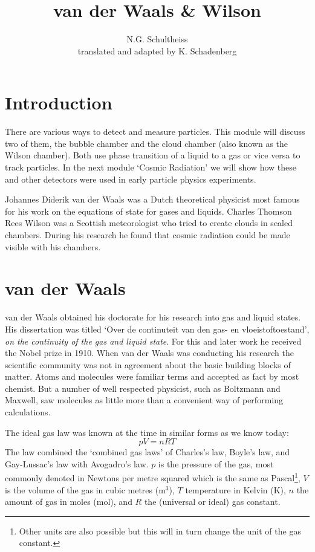 \documentclass[12pt,a4paper]{article}
\author{N.G. Schultheiss \\ translated and adapted by K. Schadenberg}
\date{}
\title{van der Waals \& Wilson}
\numberwithin{equation}{section}
\numberwithin{figure}{section}
\numberwithin{table}{section}
\begin{document}
\maketitle

\section{Introduction}
There are various ways to detect and measure particles. This module will discuss two of them, the bubble chamber and the cloud chamber (also known as the Wilson chamber). Both use phase transition of a liquid to a gas or vice versa to track particles. In the next module `Cosmic Radiation' we will show how these and other detectors were used in early particle physics experiments.

Johannes Diderik van der Waals was a Dutch theoretical physicist most famous for his work on the equations of state for gases and liquids. Charles Thomson Rees Wilson was a Scottish meteorologist who tried to create clouds in sealed chambers. During his research he found that cosmic radiation could be made visible with his chambers.

\section{van der Waals}
van der Waals obtained his doctorate for his research into gas and liquid states. His dissertation was titled `Over de continuteit van den gas- en vloeistoftoestand', \textit{on the continuity of the gas and liquid state}. For this and later work he received the Nobel prize in 1910. When van der Waals was conducting his research the scientific community was not in agreement about the basic building blocks of matter. Atoms and molecules were familiar terms and accepted as fact by most chemist. But a number of well respected physicist, such as Boltzmann and Maxwell, saw molecules as little more than a convenient way of performing calculations.

The ideal gas law was known at the time in similar forms as we know today:
\begin{equation}
pV=nRT \label{eq:ideal_gas_law}
\end{equation}
The law combined the `combined gas laws' of Charles's law, Boyle's law, and Gay-Lussac's law with Avogadro's law. $p$ is the pressure of the gas, most commonly denoted in Newtons per metre squared which is the same as Pascal\footnote{Other units are also possible but this will in turn change the unit of the gas constant.}, $V$ is the volume of the gas in cubic metres (m$^3$), $T$ temperature in Kelvin (K), $n$ the amount of gas in moles (mol), and $R$ the (universal or ideal) gas constant.
\end{document}
